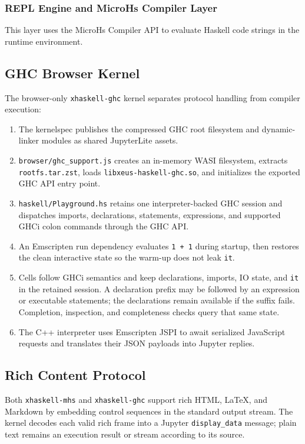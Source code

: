 \documentclass[11pt]{scrartcl}
\begin{document}
\subsubsection{REPL Engine and MicroHs Compiler Layer}


This layer uses the MicroHs Compiler API to evaluate Haskell code strings in the runtime environment.

\subsection{GHC Browser Kernel}
The browser-only \texttt{xhaskell-ghc} kernel separates protocol handling from compiler execution:
\begin{enumerate}
\item The kernelspec publishes the compressed GHC root filesystem and dynamic-linker modules as shared JupyterLite assets.
\item \texttt{browser/ghc\_support.js} creates an in-memory WASI filesystem, extracts \texttt{rootfs.tar.zst}, loads \texttt{libxeus-haskell-ghc.so}, and initializes the exported GHC API entry point.
\item \texttt{haskell/Playground.hs} retains one interpreter-backed GHC session and dispatches imports, declarations, statements, expressions, and supported GHCi colon commands through the GHC API.
\item An Emscripten run dependency evaluates \texttt{1 + 1} during startup, then restores the clean interactive state so the warm-up does not leak \texttt{it}.
\item Cells follow GHCi semantics and keep declarations, imports, IO state, and \texttt{it} in the retained session. A declaration prefix may be followed by an expression or executable statements; the declarations remain available if the suffix fails. Completion, inspection, and completeness checks query that same state.
\item The C++ interpreter uses Emscripten JSPI to await serialized JavaScript requests and translates their JSON payloads into Jupyter replies.
\end{enumerate}

\subsection{Rich Content Protocol}


Both \texttt{xhaskell-mhs} and \texttt{xhaskell-ghc} support rich HTML, LaTeX, and Markdown by embedding control sequences in the standard output stream. The kernel decodes each valid rich frame into a Jupyter \texttt{display\_data} message; plain text remains an execution result or stream according to its source.
\end{document}
